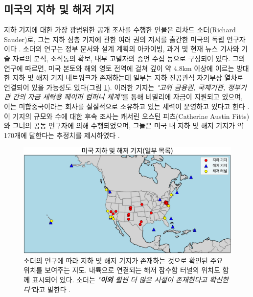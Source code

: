 \documentclass[10pt,twocolumn,letterpaper]{article}
\begin{document}
\subsection{미국의 지하 및 해저 기지}

지하 기지에 대한 가장 광범위한 공개 조사를 수행한 인물은 리차드 소더(Richard Sauder)로, 그는 지하 심층 기지에 관한 여러 권의 저서를 출간한 미국의 독립 연구자이다 \cite{22}. 소더의 연구는 정부 문서와 설계 계획의 아카이빙, 과거 및 현재 뉴스 기사와 기술 자료의 분석, 소식통의 확보, 내부 고발자의 증언 수집 등으로 구성되어 있다. 그의 연구에 따르면, 미국 본토와 해외 영토 전역에 걸쳐 깊이 약 4.8km 이상에 이르는 방대한 지하 및 해저 기지 네트워크가 존재하는데 일부는 지하 진공관식 자기부상 열차로 연결되어 있을 가능성도 있다(그림 \ref{fig:4}). 이러한 기지는 \textit{"고위 금융권, 국제기관, 정부기관 간의 자금 세탁용 페이퍼 컴퍼니 체계"}를 통해 비밀리에 자금이 지원되고 있으며, 이는 미합중국이라는 회사를 실질적으로 소유하고 있는 세력이 운영하고 있다고 한다 \cite{22}. 이 기지의 규모와 수에 대한 후속 조사는 캐서린 오스틴 피츠(Catherine Austin Fitts)와 그녀의 공동 연구자에 의해 수행되었으며, 그들은 미국 내 지하 및 해저 기지가 약 170개에 달한다는 추정치를 제시하였다 \cite{16,20}.

\begin{figure}[t]
\begin{center}
\includegraphics[width=1\textwidth]{baseskor.png}
\end{center}
   \caption{소더의 연구에 따라 지하 및 해저 기지가 존재하는 것으로 확인된 주요 위치를 보여주는 지도. 내륙으로 연결되는 해저 잠수함 터널의 위치도 함께 표시되어 있다. 소더는 \textit{"\textbf{이외} 훨씬 더 많은 시설이 존재한다고 확신한다"}라고 말한다 \cite{22}.}
   \label{fig:4}
\end{figure}
\end{document}
